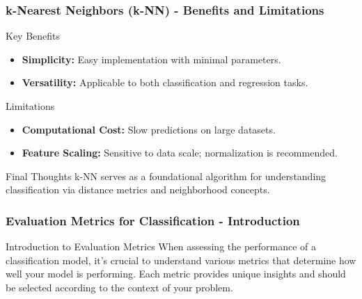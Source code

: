 \documentclass[aspectratio=169]{beamer}
\begin{document}
\begin{frame}[fragile]
    \frametitle{k-Nearest Neighbors (k-NN) - Benefits and Limitations}
    \begin{block}{Key Benefits}
        \begin{itemize}
            \item \textbf{Simplicity:} Easy implementation with minimal parameters.
            \item \textbf{Versatility:} Applicable to both classification and regression tasks.
        \end{itemize}
    \end{block}

    \begin{block}{Limitations}
        \begin{itemize}
            \item \textbf{Computational Cost:} Slow predictions on large datasets.
            \item \textbf{Feature Scaling:} Sensitive to data scale; normalization is recommended.
        \end{itemize}
    \end{block}
    
    \begin{block}{Final Thoughts}
        k-NN serves as a foundational algorithm for understanding classification via distance metrics and neighborhood concepts.
    \end{block}
\end{frame}

\begin{frame}[fragile]
  \frametitle{Evaluation Metrics for Classification - Introduction}
  \begin{block}{Introduction to Evaluation Metrics}
    When assessing the performance of a classification model, it's crucial to understand various metrics that determine how well your model is performing. Each metric provides unique insights and should be selected according to the context of your problem.
  \end{block}
\end{frame}
\end{document}
